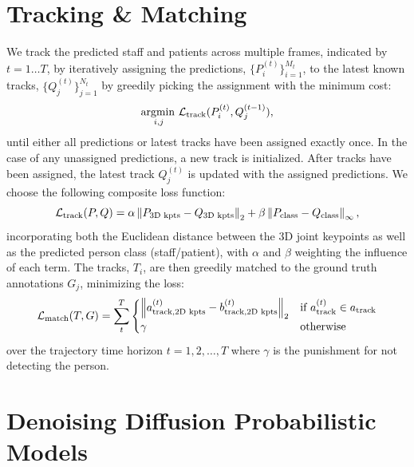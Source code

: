 \section{Tracking \& Matching}
We track the predicted staff and patients across multiple frames, indicated by $t = 1 \ldots T$, by iteratively assigning the predictions, $\{ P_i^{(t)} \}_{i=1}^{M_t}$, to the latest known tracks, $\{ Q^{(t)}_{j} \}_{j=1}^{N_t}$ by greedily picking the assignment with the minimum cost:
\begin{equation}
    \operatorname*{argmin\,}_{i,j} \mathcal{L}_\text{track}(P^{(t)}_i, Q^{(t-1)}_j),
\end{equation}
until either all predictions or latest tracks have been assigned exactly once. In the case of any unassigned predictions, a new track is initialized. After tracks have been assigned, the latest track $Q^{(t)}_j$ is updated with the assigned predictions. We choose the following composite loss function:
\begin{equation}
    \mathcal{L}_\text{track}(P, Q) = \alpha \left \lVert P_\text{3D kpts} - Q_\text{3D kpts} \right \rVert_{2} + \beta \left \lVert P_\text{class} - Q_\text{class} \right \rVert_{\infty},
\end{equation}
incorporating both the Euclidean distance between the 3D joint keypoints as well as the predicted person class (staff/patient), with $\alpha$ and $\beta$ weighting the influence of each term. The tracks, $T_i$, are then greedily matched to the ground truth annotations $G_j$, minimizing the loss:
\begin{equation}
    \mathcal{L}_\text{match}(T, G) = \sum_t^{T} \begin{cases}
        \norm{a^{(t)}_{\text{track}, \text{2D kpts}} - b^{(t)}_{\text{track}, \text{2D kpts}}}{2} & \text{if}\ a^{(t)}_\text{track} \in a_\text{track} \\
        \gamma & \text{otherwise}
    \end{cases}
\end{equation}
over the trajectory time horizon $t = 1,2,\ldots,T$ where $\gamma$ is the punishment for not detecting the person.


\section{Denoising Diffusion Probabilistic Models}

